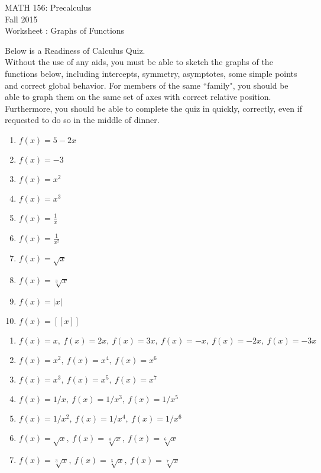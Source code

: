 \documentclass[11pt]{article}
\newcommand{\sect}{\textsection}
\begin{document}
 

\begin{center}MATH 156: Precalculus  \\ Fall 2015 \\ Worksheet \sect 2.1: Graphs of Functions\end{center}

\hrulefill

Below is a Readiness of Calculus Quiz.\\

Without the use of any aids, you must be able to sketch the graphs of the functions below, including intercepts, symmetry, asymptotes, some simple points and correct global behavior. For members of the same ``family", you should be able to graph them on the same set of axes with correct relative position.\\  

Furthermore, you should be able to complete the quiz in quickly, correctly, even if requested to do so in the middle of dinner.\\

\hrulefill

{}
\begin{enumerate}
\item $f(x)=5-2x$
\vfill
\item $f(x)=-3$
\vfill
\item $f(x)=x^2$
\vfill
\item $f(x)=x^3$
\vfill
\item $f(x)=\frac{1}{x}$
\vfill
\item $f(x)=\frac{1}{x^2}$
\vfill
\item $f(x)=\sqrt{x}$
\vfill
\item $f(x)=\sqrt[3]{x}$
\vfill
\item $f(x)=\vert x \vert$
\vfill
\item $f(x)=[\![x]\!]$
\vfill
\end{enumerate}
\newpage

{}

\begin{enumerate}

\item $f(x)=x,\: f(x)=2x, \: f(x) = 3x, \: f(x)=-x,\: f(x)=-2x, \: f(x) = -3x$
\vfill
\item $f(x)=x^2, \:f(x)=x^4, \:f(x)=x^6$
\vfill
\item $f(x)=x^3, \:f(x)=x^5, \:f(x)=x^7 $
\vfill
\item $f(x)=1/x ,\:f(x)=1/x^3, \:f(x)=1/x^5 $
\vfill
\item $f(x)=1/x^2, \:f(x)=1/x^4, \:f(x)=1/x^6 $
\vfill
\item $f(x)=\sqrt{x}, \:f(x)=\sqrt[4]{x}, \:f(x)=\sqrt[6]{x}$
\vfill
\item $f(x)=\sqrt[3]{x}, \:f(x)=\sqrt[5]{x} ,\:f(x)=\sqrt[7]{x}$
\vfill
\end{enumerate}
\end{document}
